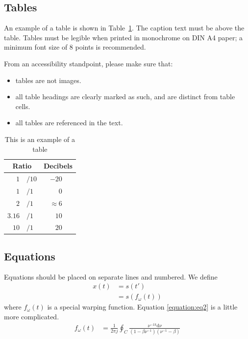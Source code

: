 \documentclass[cameraready]{Interspeech}
\begin{document}
\subsection{Tables}\label{sec:tables}

An example of a table is shown in Table~\ref{tab:example}. The caption text must be above the table. Tables must be legible when printed in monochrome on DIN A4 paper; a minimum font size of 8 points is recommended. 

From an accessibility standpoint, please make sure that:
    \begin{itemize}
        \item tables are not images.
        \item all table headings are clearly marked as such, and are distinct from table cells.
        \item all tables are referenced in the text.
    \end{itemize}

\begin{table}[th]
  \caption{This is an example of a table}
  \label{tab:example}
  \centering
  \begin{tabular}{ r@{}l  r }
    \toprule
    \multicolumn{2}{c}{\textbf{Ratio}} &
                                         \multicolumn{1}{c}{\textbf{Decibels}} \\
    \midrule
    $1$                       & $/10$ & $-20$~~~             \\
    $1$                       & $/1$  & $0$~~~               \\
    $2$                       & $/1$  & $\approx 6$~~~       \\
    $3.16$                    & $/1$  & $10$~~~              \\
    $10$                      & $/1$  & $20$~~~              \\
    \bottomrule
  \end{tabular}

\end{table}



\subsection{Equations}

Equations should be placed on separate lines and numbered. We define
%
\begin{align}
  x(t) &= s(t') \nonumber \\
       &= s(f_\omega(t))
\end{align}
%
where \(f_\omega(t)\) is a special warping function. Equation \ref{equation:eq2} is a little more complicated.
%
\begin{align}
  f_\omega(t) &= \frac{1}{2 \pi j} \oint_C
  \frac{\nu^{-1k} \mathrm{d} \nu}
  {(1-\beta\nu^{-1})(\nu^{-1}-\beta)}
  \label{equation:eq2}
\end{align}
%
\end{document}

